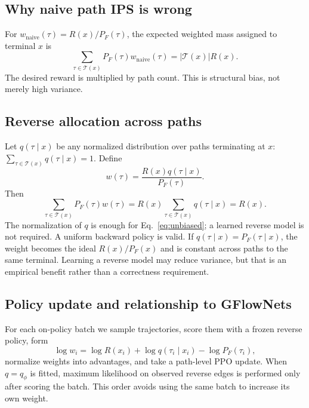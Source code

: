 \documentclass[11pt]{article}
\begin{document}
\subsection{Why naive path IPS is wrong}

For \(w_{\mathrm{naive}}(\tau)=R(x)/P_F(\tau)\), the expected weighted mass
assigned to terminal \(x\) is
\begin{equation}
 \sum_{\tau\in\mathcal T(x)}P_F(\tau)w_{\mathrm{naive}}(\tau)
 =|\mathcal T(x)|R(x).
\end{equation}
The desired reward is multiplied by path count. This is structural bias, not
merely high variance.

\subsection{Reverse allocation across paths}

Let \(q(\tau\mid x)\) be any normalized distribution over paths terminating
at \(x\): \(\sum_{\tau\in\mathcal T(x)}q(\tau\mid x)=1\). Define
\begin{equation}
 w(\tau)=\frac{R(x)q(\tau\mid x)}{P_F(\tau)}.
 \label{eq:mips}
\end{equation}
Then
\begin{equation}
 \sum_{\tau\in\mathcal T(x)}P_F(\tau)w(\tau)
 =R(x)\sum_{\tau\in\mathcal T(x)}q(\tau\mid x)=R(x).
 \label{eq:unbiased}
\end{equation}
The normalization of \(q\) is enough for Eq.~\eqref{eq:unbiased}; a learned
reverse model is not required. A uniform backward policy is valid. If
\(q(\tau\mid x)=P_F(\tau\mid x)\), the weight becomes the ideal
\(R(x)/P_F(x)\) and is constant across paths to the same terminal. Learning a
reverse model may reduce variance, but that is an empirical benefit rather
than a correctness requirement.

\subsection{Policy update and relationship to GFlowNets}

For each on-policy batch we sample trajectories, score them with a frozen
reverse policy, form
\begin{equation}
 \log w_i=\log R(x_i)+\log q(\tau_i\mid x_i)-\log P_F(\tau_i),
\end{equation}
normalize weights into advantages, and take a path-level PPO update. When
\(q=q_\phi\) is fitted, maximum likelihood on observed reverse edges is
performed only after scoring the batch. This order avoids using the same batch
to increase its own weight.
\end{document}
